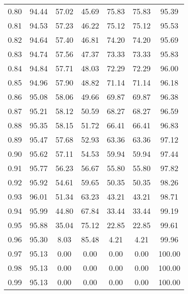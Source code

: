 \begin{tabular}{|c|c|c|c|c|c|c|}
      0.80 &     94.44 &     57.02 &      45.69 &   75.83 &      75.83 &         95.39 \\
      0.81 &     94.53 &     57.23 &      46.22 &   75.12 &      75.12 &         95.53 \\
      0.82 &     94.64 &     57.40 &      46.81 &   74.20 &      74.20 &         95.69 \\
      0.83 &     94.74 &     57.56 &      47.37 &   73.33 &      73.33 &         95.83 \\
      0.84 &     94.84 &     57.71 &      48.03 &   72.29 &      72.29 &         96.00 \\
      0.85 &     94.96 &     57.90 &      48.82 &   71.14 &      71.14 &         96.18 \\
      0.86 &     95.08 &     58.06 &      49.66 &   69.87 &      69.87 &         96.38 \\
      0.87 &     95.21 &     58.12 &      50.59 &   68.27 &      68.27 &         96.59 \\
      0.88 &     95.35 &     58.15 &      51.72 &   66.41 &      66.41 &         96.83 \\
      0.89 &     95.47 &     57.68 &      52.93 &   63.36 &      63.36 &         97.12 \\
      0.90 &     95.62 &     57.11 &      54.53 &   59.94 &      59.94 &         97.44 \\
      0.91 &     95.77 &     56.23 &      56.67 &   55.80 &      55.80 &         97.82 \\
      0.92 &     95.92 &     54.61 &      59.65 &   50.35 &      50.35 &         98.26 \\
      0.93 &     96.01 &     51.34 &      63.23 &   43.21 &      43.21 &         98.71 \\
      0.94 &     95.99 &     44.80 &      67.84 &   33.44 &      33.44 &         99.19 \\
      0.95 &     95.88 &     35.04 &      75.12 &   22.85 &      22.85 &         99.61 \\
      0.96 &     95.30 &      8.03 &      85.48 &    4.21 &       4.21 &         99.96 \\
      0.97 &     95.13 &      0.00 &       0.00 &    0.00 &       0.00 &        100.00 \\
      0.98 &     95.13 &      0.00 &       0.00 &    0.00 &       0.00 &        100.00 \\
      0.99 &     95.13 &      0.00 &       0.00 &    0.00 &       0.00 &        100.00 \\
\bottomrule
\end{tabular}
